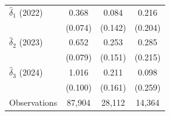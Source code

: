 \begin{tabular}{l*{3}{c}}
$\hat{\delta}_1$ (2022)&       0.368\sym{***}&       0.084         &       0.216         \\
            &     (0.074)         &     (0.142)         &     (0.204)         \\
\addlinespace
$\hat{\delta}_2$ (2023)&       0.652\sym{***}&       0.253\sym{*}  &       0.285         \\
            &     (0.079)         &     (0.151)         &     (0.215)         \\
\addlinespace
$\hat{\delta}_3$ (2024)&       1.016\sym{***}&       0.211         &       0.098         \\
            &     (0.100)         &     (0.161)         &     (0.259)         \\
\midrule
Observations&      87,904         &      28,112         &      14,364         \\
\bottomrule \end{tabular}
